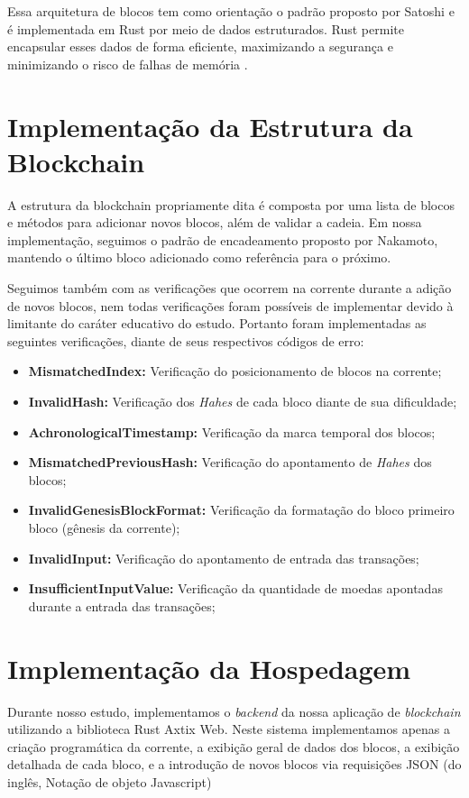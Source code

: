 Essa arquitetura de blocos tem como orientação o padrão proposto por Satoshi e é implementada em Rust por meio de dados estruturados. Rust permite encapsular esses dados de forma eficiente, maximizando a segurança e minimizando o risco de falhas de memória \cite{matsakis2014rust}.

\section*{Implementação da Estrutura da Blockchain}
A estrutura da blockchain propriamente dita é composta por uma lista de blocos e métodos para adicionar novos blocos, além de validar a cadeia. Em nossa implementação, seguimos o padrão de encadeamento proposto por Nakamoto, mantendo o último bloco adicionado como referência para o próximo.

Seguimos também com as verificações que ocorrem na corrente durante a adição de novos blocos, nem todas verificações foram possíveis de implementar devido à limitante do caráter educativo do estudo. Portanto foram implementadas as seguintes verificações, diante de seus respectivos códigos de erro:

\begin{itemize}
    \item \textbf{MismatchedIndex:} Verificação do posicionamento de blocos na corrente;
    \item \textbf{InvalidHash:} Verificação dos \textit{Hahes} de cada bloco diante de sua dificuldade;
    \item \textbf{AchronologicalTimestamp:} Verificação da marca temporal dos blocos;
    \item \textbf{MismatchedPreviousHash:} Verificação do apontamento de \textit{Hahes} dos blocos;
    \item \textbf{InvalidGenesisBlockFormat:} Verificação da formatação do bloco primeiro bloco (gênesis da corrente);
    \item \textbf{InvalidInput:} Verificação do apontamento de entrada das transações;
    \item \textbf{InsufficientInputValue:} Verificação da quantidade de moedas apontadas durante a entrada das transações; 

\end{itemize}

\section*{Implementação da Hospedagem}
Durante nosso estudo, implementamos o \textit{backend} da nossa aplicação de \textit{blockchain} utilizando a biblioteca Rust Axtix Web. Neste sistema implementamos apenas a criação programática da corrente, a exibição geral de dados dos blocos, a exibição detalhada de cada bloco, e a introdução de novos blocos via requisições JSON (do inglês, Notação de objeto Javascript)

